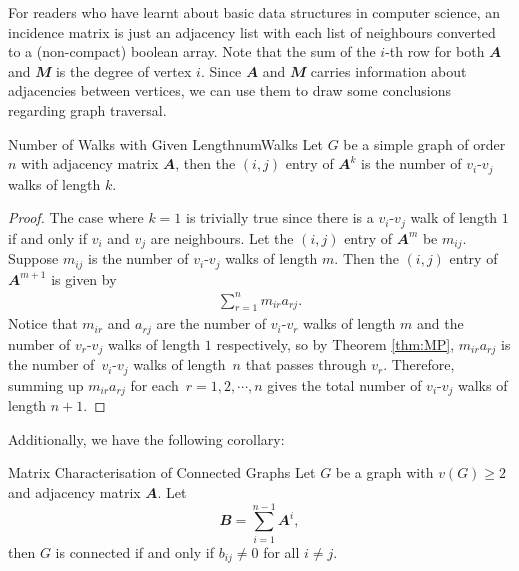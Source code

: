 \documentclass[math]{amznotes}
\theoremstyle{remark}
\newcommand{\0}{\mathbf{0}}
\newcommand{\1}{\mathbf{1}}
\begin{document}
For readers who have learnt about basic data structures in computer science, an incidence matrix is just an adjacency list with each list of neighbours converted to a (non-compact) boolean array. Note that the sum of the $i$-th row for both $\mathbfit{A}$ and $\mathbfit{M}$ is the degree of vertex $i$. Since $\mathbfit{A}$ and $\mathbfit{M}$ carries information about adjacencies between vertices, we can use them to draw some conclusions regarding graph traversal.
\begin{probox}{Number of Walks with Given Length}{numWalks}
    Let $G$ be a simple graph of order $n$ with adjacency matrix $\mathbfit{A}$, then the $(i, j)$ entry of $\mathbfit{A}^k$ is the number of $v_i$-$v_j$ walks of length $k$.
    \tcblower   
    \begin{proof}
        The case where $k = 1$ is trivially true since there is a $v_i$-$v_j$ walk of length $1$ if and only if $v_i$ and $v_j$ are neighbours. Let the $(i, j)$ entry of $\mathbfit{A}^m$ be $m_{ij}$. Suppose $m_{ij}$ is the number of $v_i$-$v_j$ walks of length $m$. Then the $(i, j)$ entry of $\mathbfit{A}^{m + 1}$ is given by
        \begin{align*}
            \sum_{r = 1}^{n}m_{ir}a_{rj}.
        \end{align*}
        Notice that $m_{ir}$ and $a_{rj}$ are the number of $v_i$-$v_r$ walks of length $m$ and the number of $v_r$-$v_j$ walks of length $1$ respectively, so by Theorem \ref{thm:MP}, $m_{ir}a_{rj}$ is the number of~$v_i$-$v_j$ walks of length~$n$ that passes through $v_r$. Therefore, summing up $m_{ir}a_{rj}$ for each~$r = 1, 2, \cdots, n$ gives the total number of $v_i$-$v_j$ walks of length $n + 1$.
    \end{proof}
\end{probox}
Additionally, we have the following corollary:
\begin{corbox}{Matrix Characterisation of Connected Graphs}{}
    Let $G$ be a graph with $v(G) \geq 2$ and adjacency matrix $\mathbfit{A}$. Let
    \begin{equation*}
        \mathbfit{B} = \sum_{i = 1}^{n - 1}\mathbfit{A}^i,
    \end{equation*}
    then $G$ is connected if and only if $b_{ij} \neq 0$ for all $i \neq j$.
\end{corbox}
\end{document}
